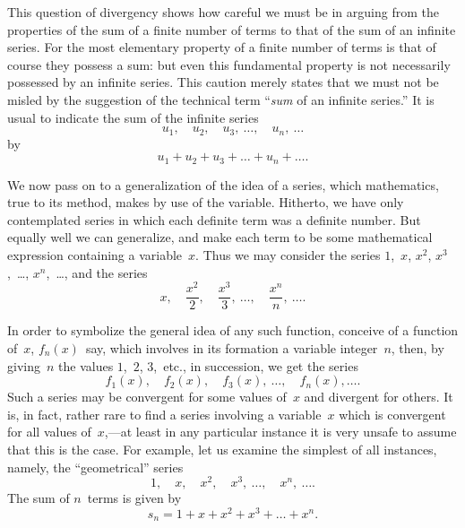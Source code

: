 \documentclass[12pt,leqno]{book}[2005/09/16]
\newcommand{\Chg}[2]{#2}
\newcommand{\Add}[1]{\Chg{}{#1}}
\newcommand{\PageSep}[1]{\ignorespaces}
\begin{document}
This question of divergency shows how
careful we must be in arguing from the properties
\PageSep{205}
of the sum of a finite number of terms
to that of the sum of an infinite series. For
the most elementary property of a finite
number of terms is that of course they
possess a sum: but even this fundamental
property is not necessarily possessed by an
infinite series. This caution merely states
that we must not be misled by the suggestion
of the technical term ``\emph{sum} of an infinite
series.'' It is usual to indicate the sum of
the infinite series
\[
u_{1},\quad
u_{2},\quad
u_{3},\ \dots\Add{,}\quad
u_{n}\Add{,}\ \dots
\]
by
\[
u_{1} + u_{2} + u_{3} + \dots + u_{n} + \dots\Add{.}
\]

We now pass on to a generalization of the
idea of a series, which mathematics, true to
its method, makes by use of the variable.
Hitherto, we have only contemplated series
in which each definite term was a definite
number. But equally well we can generalize,
and make each term to be some mathematical
expression containing a variable~$x$. Thus
we may consider the series $1$,~$x$, $x^{2}$, $x^{3}$,~\dots,
$x^{n}$,~\dots, and the series
\[
x,\quad
\frac{x^{2}}{2},\quad
\frac{x^{3}}{3},\ \dots,\quad
\frac{x^{n}}{n},\ \dots\Add{.}
\]

In order to symbolize the general idea of
any such function, conceive of a function of~$x$,
$f_{n}(x)$~say, which involves in its formation
a variable integer~$n$, then, by giving~$n$ the
\PageSep{206}
values $1$,~$2$, $3$,~etc., in succession, we get the
series
\[
f_{1}(x),\quad
f_{2}(x),\quad
f_{3}(x),\ \dots,\quad
f_{n}(x),\dots\Add{.}
\]
Such a series may be convergent for some
values of~$x$ and divergent for others. It is,
in fact, rather rare to find a series involving a
variable~$x$ which is convergent for all values
of~$x$,---at least in any particular instance it is
very unsafe to assume that this is the case.
For example, let us examine the simplest of
all instances, namely, the ``geometrical''
%
series
\[
1,\quad x,\quad x^{2},\quad x^{3},\ \dots,\quad x^{n},\ \dots\Add{.}
\]
The sum of $n$~terms is given by
\[
s_{n} = 1 + x + x^{2} + x^{3} + \dots + x^{n}.
\]
\end{document}
